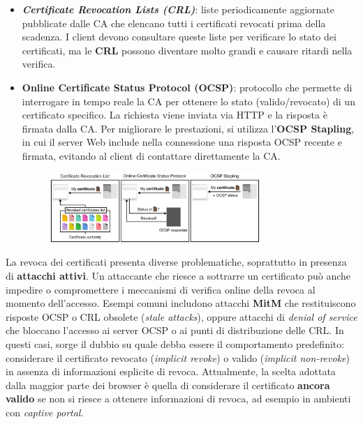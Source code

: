 \begin{flushleft}
    \begin{itemize}[nosep]
        \item \textbf{\textit{Certificate Revocation Lists (CRL)}}: liste periodicamente aggiornate pubblicate dalle CA che elencano tutti i certificati revocati prima della scadenza. I client devono consultare queste liste per verificare lo stato dei certificati, ma le \textbf{CRL} possono diventare molto grandi e causare ritardi nella verifica.
        
        \item \textbf{Online Certificate Status Protocol (OCSP)}: protocollo che permette di interrogare in tempo reale la CA per ottenere lo stato (valido/revocato) di un certificato specifico. La richiesta viene inviata via HTTP e la risposta è firmata dalla CA. Per migliorare le prestazioni, si utilizza l'\textbf{OCSP Stapling}, in cui il server Web include nella connessione una risposta OCSP recente e firmata, evitando al client di contattare direttamente la CA.

        \begin{figure}[h]
            \centering
            \includegraphics[width=0.75\textwidth]{img/ocsp_sta.png}
        \end{figure}
    \end{itemize}

    La revoca dei certificati presenta diverse problematiche, soprattutto in presenza di \textbf{attacchi attivi}. Un attaccante che riesce a sottrarre un certificato può anche impedire o compromettere i meccanismi di verifica online della revoca al momento dell'accesso. Esempi comuni includono attacchi \textbf{MitM} che restituiscono risposte OCSP o CRL obsolete (\textit{stale attacks}), oppure attacchi di \textit{denial of service} che bloccano l'accesso ai server OCSP o ai punti di distribuzione delle CRL. In questi casi, sorge il dubbio su quale debba essere il comportamento predefinito: considerare il certificato revocato (\textit{implicit revoke}) o valido (\textit{implicit non-revoke}) in assenza di informazioni esplicite di revoca. Attualmente, la scelta adottata dalla maggior parte dei browser è quella di considerare il certificato \textbf{ancora valido} se non si riesce a ottenere informazioni di revoca, ad esempio in ambienti con \textit{captive portal}.


\end{flushleft}
